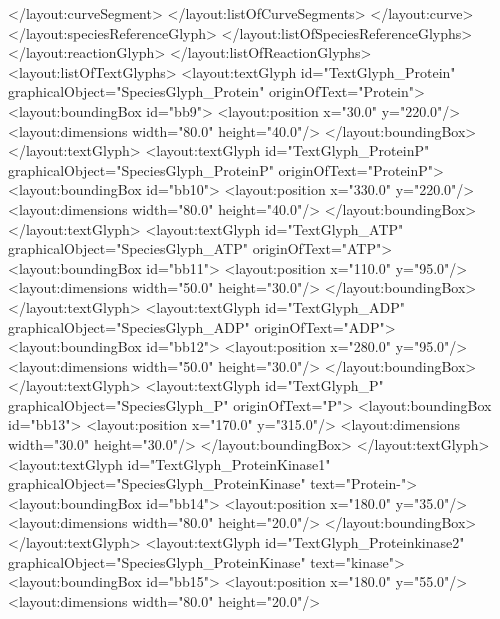 {\begin{example}
          </layout:curveSegment>
         </layout:listOfCurveSegments>
        </layout:curve>
       </layout:speciesReferenceGlyph>
      </layout:listOfSpeciesReferenceGlyphs>
     </layout:reactionGlyph>
    </layout:listOfReactionGlyphs>
    <layout:listOfTextGlyphs>
     <layout:textGlyph id="TextGlyph_Protein" 
                       graphicalObject="SpeciesGlyph_Protein"
                       originOfText="Protein">
      <layout:boundingBox id="bb9">
       <layout:position x="30.0" y="220.0"/>
       <layout:dimensions width="80.0" height="40.0"/>
      </layout:boundingBox>
     </layout:textGlyph>
     <layout:textGlyph id="TextGlyph_ProteinP"
                       graphicalObject="SpeciesGlyph_ProteinP"
                       originOfText="ProteinP">
      <layout:boundingBox id="bb10">
       <layout:position x="330.0" y="220.0"/>
       <layout:dimensions width="80.0" height="40.0"/>
      </layout:boundingBox>
     </layout:textGlyph>
     <layout:textGlyph id="TextGlyph_ATP"
                       graphicalObject="SpeciesGlyph_ATP" 
                       originOfText="ATP">
      <layout:boundingBox id="bb11">
       <layout:position x="110.0" y="95.0"/>
       <layout:dimensions width="50.0" height="30.0"/>
      </layout:boundingBox>
     </layout:textGlyph>
     <layout:textGlyph id="TextGlyph_ADP" 
                       graphicalObject="SpeciesGlyph_ADP"
                       originOfText="ADP">
      <layout:boundingBox id="bb12">
       <layout:position x="280.0" y="95.0"/>
       <layout:dimensions width="50.0" height="30.0"/>
      </layout:boundingBox>
     </layout:textGlyph>
     <layout:textGlyph id="TextGlyph_P"
                       graphicalObject="SpeciesGlyph_P"
                       originOfText="P">
      <layout:boundingBox id="bb13">
       <layout:position x="170.0" y="315.0"/>
       <layout:dimensions width="30.0" height="30.0"/>
      </layout:boundingBox>
     </layout:textGlyph>
     <layout:textGlyph id="TextGlyph_ProteinKinase1"
                       graphicalObject="SpeciesGlyph_ProteinKinase"
                       text="Protein-">
      <layout:boundingBox id="bb14">
       <layout:position x="180.0" y="35.0"/>
       <layout:dimensions width="80.0" height="20.0"/>
      </layout:boundingBox>
     </layout:textGlyph>
     <layout:textGlyph id="TextGlyph_Proteinkinase2" 
                       graphicalObject="SpeciesGlyph_ProteinKinase"
                       text="kinase">
      <layout:boundingBox id="bb15">
       <layout:position x="180.0" y="55.0"/>
       <layout:dimensions width="80.0" height="20.0"/>

\end{example}}
